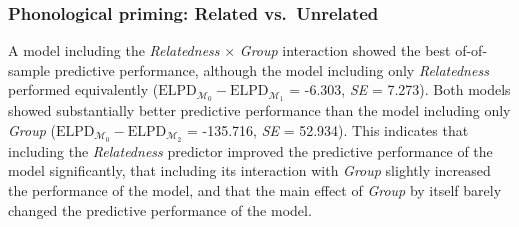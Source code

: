 \documentclass[
  letterpaper,
  DIV=11,
  numbers=noendperiod]{scrartcl}
\begin{document}
\hypertarget{phonological-priming-related-vs.-unrelated-2}{%
\subsubsection{Phonological priming: Related
vs.~Unrelated}\label{phonological-priming-related-vs.-unrelated-2}}

A model including the \emph{Relatedness} \(\times\) \emph{Group}
interaction showed the best of-of-sample predictive performance,
although the model including only \emph{Relatedness} performed
equivalently
(\(\text{ELPD}_{\mathcal{M_0}} - \text{ELPD}_{\mathcal{M_1}}\) = -6.303,
\emph{SE} = 7.273). Both models showed substantially better predictive
performance than the model including only \emph{Group}
(\(\text{ELPD}_{\mathcal{M_0}} - \text{ELPD}_{\mathcal{M_2}}\) =
-135.716, \emph{SE} = 52.934). This indicates that including the
\emph{Relatedness} predictor improved the predictive performance of the
model significantly, that including its interaction with \emph{Group}
slightly increased the performance of the model, and that the main
effect of \emph{Group} by itself barely changed the predictive
performance of the model.
\end{document}
